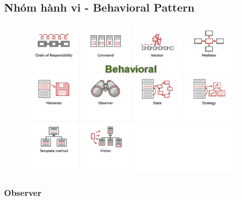 \documentclass{article}
\begin{document}
    \begin{center}
        \hspace{0pt}
        \vfill
        \part{Nhóm hành vi - Behavioral Pattern}
        \begin{figure}[htp]
            \begin{center}
                \includegraphics[scale=0.65]{./image/behavioral-pattern.png}
            \end{center}
        \end{figure}
        \vfill
        \hspace{0pt}
    \end{center}
    \pagebreak

    \section{Observer}
\end{document}
